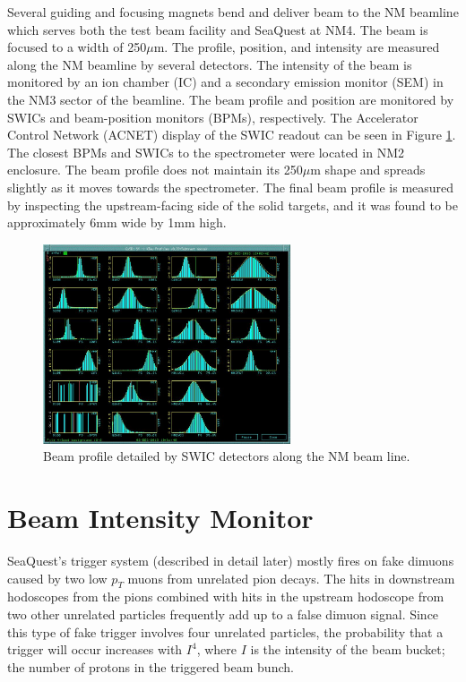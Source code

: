 Several guiding and focusing magnets bend and deliver beam to the NM beamline which serves both the test beam facility and SeaQuest at NM4. The beam is focused to a width of 250$\mu$m. The profile, position, and intensity are measured along the NM beamline by several detectors. The intensity of the beam is monitored by an ion chamber (IC) and a secondary emission monitor (SEM) in the NM3 sector of the beamline. The beam profile and position are monitored by SWICs and beam-position monitors (BPMs), respectively. The Accelerator Control Network (ACNET) display of the SWIC readout can be seen in Figure \ref{fig:Profile}. The closest BPMs and SWICs to the spectrometer were located in NM2 enclosure. The beam profile does not maintain its 250$\mu$m shape and spreads slightly as it moves towards the spectrometer. The final beam profile is measured by inspecting the upstream-facing side of the solid targets, and it was found to be approximately 6mm wide by 1mm high.

\begin{figure}
	\begin{center}
		\includegraphics[width=0.65\textwidth]{figures/apparatus/swic.jpg}
		\caption{Beam profile detailed by SWIC detectors along the NM beam line.}
		\label{fig:Profile}
	\end{center}
\end{figure}

\section{Beam Intensity Monitor}

SeaQuest's trigger system (described in detail later) mostly fires on fake dimuons caused by two low $p_T$ muons from unrelated pion decays. The hits in downstream hodoscopes from the pions combined with hits in the upstream hodoscope from two other unrelated particles frequently add up to a false dimuon signal. Since this type of fake trigger involves four unrelated particles, the probability that a trigger will occur increases with $I^4$, where $I$ is the intensity of the beam bucket; the number of protons in the triggered beam bunch.

